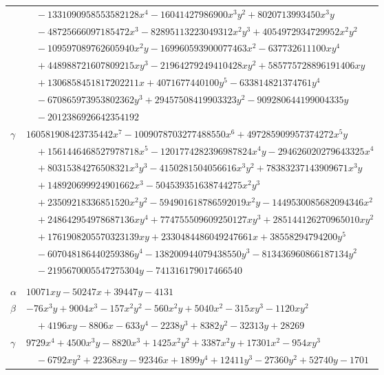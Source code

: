\documentclass[11pt]{article}
\begin{document}
\begin{longtable}{@{}ll@{}}
 & $\quad -1331090958553582128x^{4}-16041427986900x^{3}y^{2}+8020713993450x^{3}y$\\
 & $\quad -48725666097185472x^{3}-82895113223049312x^{2}y^{3}+4054972934729952x^{2}y^{2}$\\
 & $\quad -109597089762605940x^{2}y-169960593900077463x^{2}-637732611100xy^{4}$\\
 & $\quad +448988721607809215xy^{3}-21964279249410428xy^{2}+585775728896191406xy$\\
 & $\quad +1306858451817202211x+4071677440100y^{5}-633814821374761y^{4}$\\
 & $\quad -670865973953802362y^{3}+29457508419903323y^{2}-909280644199004335y$\\
 & $\quad -2012386926642354192$\\
$\gamma$ & $160581908423735442x^{7}-1009078703277488550x^{6}+497285909957374272x^{5}y$\\
 & $\quad +1561446468527978718x^{5}-1201774282396987824x^{4}y-294626020279643325x^{4}$\\
 & $\quad +80315384276508321x^{3}y^{3}-4150281504056616x^{3}y^{2}+78383237143909671x^{3}y$\\
 & $\quad +148920699924901662x^{3}-504539351638744275x^{2}y^{3}$\\
 & $\quad +23509218336851520x^{2}y^{2}-594901618786592019x^{2}y-1449530085682094346x^{2}$\\
 & $\quad +248642954978687136xy^{4}+774755509609250127xy^{3}+285144126270965010xy^{2}$\\
 & $\quad +1761908205570323139xy+2330484486049247661x+38558294794200y^{5}$\\
 & $\quad -607048186440259386y^{4}-138200944079438550y^{3}-813436960866187134y^{2}$\\
 & $\quad -2195670005547275304y-741316179017466540$\\
\addlinespace[3pt]
\multicolumn{2}{@{}l}{$\{i,j\}=\{6,183\}$, $k_{ij}=2^{3}\cdot 3^{6}\cdot 13$}\\
$\alpha$ & $10071xy-50247x+39447y-4131$\\
$\beta$ & $-76x^{3}y+9004x^{3}-157x^{2}y^{2}-560x^{2}y+5040x^{2}-315xy^{3}-1120xy^{2}$\\
 & $\quad +4196xy-8806x-633y^{4}-2238y^{3}+8382y^{2}-32313y+28269$\\
$\gamma$ & $9729x^{4}+4500x^{3}y-8820x^{3}+1425x^{2}y^{2}+3387x^{2}y+17301x^{2}-954xy^{3}$\\
 & $\quad -6792xy^{2}+22368xy-92346x+1899y^{4}+12411y^{3}-27360y^{2}+52740y-1701$\\

\end{longtable}
\end{document}
